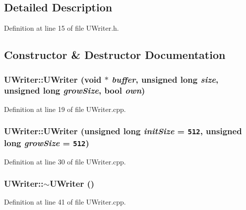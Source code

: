 \subsection{Detailed Description}


Definition at line 15 of file UWriter.h.

\subsection{Constructor \& Destructor Documentation}
\hypertarget{class_u_writer_84ac4e433ef43762c38e973b50b2a900}{
\subsubsection[{UWriter}]{\setlength{\rightskip}{0pt plus 5cm}UWriter::UWriter (void $\ast$ {\em buffer}, \/  unsigned long {\em size}, \/  unsigned long {\em growSize}, \/  bool {\em own})}}
\label{class_u_writer_84ac4e433ef43762c38e973b50b2a900}




Definition at line 19 of file UWriter.cpp.\hypertarget{class_u_writer_676a90967b367e7787dfc1441a0f43cc}{
\subsubsection[{UWriter}]{\setlength{\rightskip}{0pt plus 5cm}UWriter::UWriter (unsigned long {\em initSize} = {\tt 512}, \/  unsigned long {\em growSize} = {\tt 512})}}
\label{class_u_writer_676a90967b367e7787dfc1441a0f43cc}




Definition at line 30 of file UWriter.cpp.\hypertarget{class_u_writer_8121227135a3e5565f9fb01d3864b112}{
\subsubsection[{$\sim$UWriter}]{\setlength{\rightskip}{0pt plus 5cm}UWriter::$\sim$UWriter ()}}
\label{class_u_writer_8121227135a3e5565f9fb01d3864b112}




Definition at line 41 of file UWriter.cpp.

